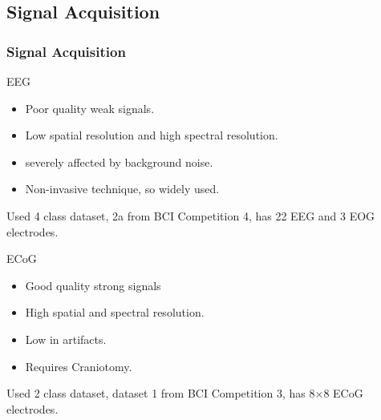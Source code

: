 \documentclass[11pt]{beamer}
\begin{document}
\subsection{Signal Acquisition}
\begin{frame}[shrink=5]
\frametitle{Signal Acquisition}
\begin{block}{EEG}
  \begin{itemize}
    \item Poor quality weak signals.
      \item Low spatial resolution and high spectral resolution.
        \item severely affected by background noise.
        \item Non-invasive technique, so widely used.
     \end{itemize} 
     Used 4 class dataset, 2a from BCI Competition 4, has 22 EEG and 3 EOG electrodes. 
\end{block}

\begin{block}{ECoG}
 \begin{itemize}
    \item Good quality strong signals
      \item High spatial and spectral resolution.
        \item Low in artifacts.
        \item Requires Craniotomy.
     \end{itemize}
     Used 2 class dataset, dataset 1 from BCI Competition 3, has 8$\times$8 ECoG electrodes. 
      \end{block}
\end{frame}
\end{document}
